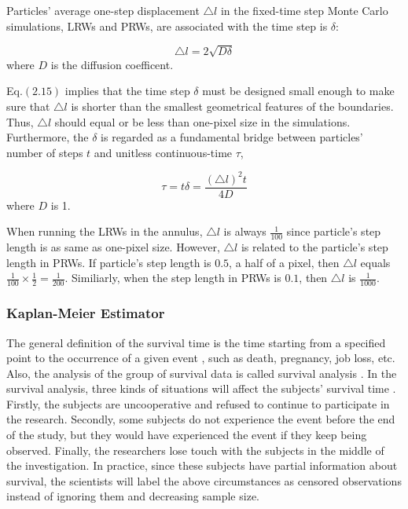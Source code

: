 Particles' average one-step displacement $\triangle l$ in the
fixed-time step Monte Carlo simulations, LRWs and PRWs, are associated
with the time step is $\delta$:

\begin{equation}
  \triangle l = 2 \sqrt{D \delta}
\end{equation}
where $D$ is the diffusion coefficent.

Eq.$(2.15)$ implies that the time step $\delta$ must be designed small
enough to make sure that $\triangle l$ is shorter than the smallest
geometrical features of the boundaries. Thus, $\triangle l$ should
equal or be less than one-pixel size in the simulations. Furthermore,
the $\delta$ is regarded as a fundamental bridge between particles'
number of steps $t$ and unitless continuous-time $\tau$,

\begin{equation}
 \tau = t \delta = \frac{(\triangle l)^2 t}{4D}
\end{equation}
where $D$ is 1.

When running the LRWs in the annulus, $\triangle l$ is always
$\frac{1}{100}$ since particle's step length is as same as one-pixel
size. However, $\triangle l$ is related to the particle's step length
in PRWs. If particle's step length is $0.5$, a half of a pixel, then
$\triangle l$ equals $\frac{1}{100} \times \frac{1}{2} =
\frac{1}{200}$.  Similiarly, when the step length in PRWs is $0.1$,
then $\triangle l$ is $\frac{1}{1000}$. 


\subsubsection{Kaplan-Meier Estimator}

The general definition of the survival time is the time starting from
a specified point to the occurrence of a given event
\cite{bewick2004statistics}, such as death, pregnancy, job loss,
etc. Also, the analysis of the group of survival data is called
survival analysis \cite{altman1990practical}. In the survival
analysis, three kinds of situations will affect the subjects' survival
time \cite{goel2010understanding}. Firstly, the subjects are
uncooperative and refused to continue to participate in the
research. Secondly, some subjects do not experience the event before
the end of the study, but they would have experienced the event if
they keep being observed. Finally, the researchers lose touch with the
subjects in the middle of the investigation. In practice, since these
subjects have partial information about survival, the scientists will
label the above circumstances as censored observations
\cite{bewick2004statistics} instead of ignoring them and decreasing
sample size. 

